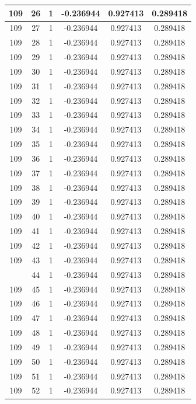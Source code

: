 \documentclass[12pt,a4paper]{article}
\numberwithin{equation}{section}
\numberwithin{figure}{section}
\numberwithin{table}{section}
\begin{document}
\begin{longtable}{|c|c|c|c|c|c|}
109 & 26 & 1 & -0.236944 & 0.927413 & 0.289418 \\ \hline
109 & 27 & 1 & -0.236944 & 0.927413 & 0.289418 \\ \hline
109 & 28 & 1 & -0.236944 & 0.927413 & 0.289418 \\ \hline
109 & 29 & 1 & -0.236944 & 0.927413 & 0.289418 \\ \hline
109 & 30 & 1 & -0.236944 & 0.927413 & 0.289418 \\ \hline
109 & 31 & 1 & -0.236944 & 0.927413 & 0.289418 \\ \hline
109 & 32 & 1 & -0.236944 & 0.927413 & 0.289418 \\ \hline
109 & 33 & 1 & -0.236944 & 0.927413 & 0.289418 \\ \hline
109 & 34 & 1 & -0.236944 & 0.927413 & 0.289418 \\ \hline
109 & 35 & 1 & -0.236944 & 0.927413 & 0.289418 \\ \hline
109 & 36 & 1 & -0.236944 & 0.927413 & 0.289418 \\ \hline
109 & 37 & 1 & -0.236944 & 0.927413 & 0.289418 \\ \hline
109 & 38 & 1 & -0.236944 & 0.927413 & 0.289418 \\ \hline
109 & 39 & 1 & -0.236944 & 0.927413 & 0.289418 \\ \hline
109 & 40 & 1 & -0.236944 & 0.927413 & 0.289418 \\ \hline
109 & 41 & 1 & -0.236944 & 0.927413 & 0.289418 \\ \hline
109 & 42 & 1 & -0.236944 & 0.927413 & 0.289418 \\ \hline
109 & 43 & 1 & -0.236944 & 0.927413 & 0.289418 \\ \hline
\pagebreak
109 & 44 & 1 & -0.236944 & 0.927413 & 0.289418 \\ \hline
109 & 45 & 1 & -0.236944 & 0.927413 & 0.289418 \\ \hline
109 & 46 & 1 & -0.236944 & 0.927413 & 0.289418 \\ \hline
109 & 47 & 1 & -0.236944 & 0.927413 & 0.289418 \\ \hline
109 & 48 & 1 & -0.236944 & 0.927413 & 0.289418 \\ \hline
109 & 49 & 1 & -0.236944 & 0.927413 & 0.289418 \\ \hline
109 & 50 & 1 & -0.236944 & 0.927413 & 0.289418 \\ \hline
109 & 51 & 1 & -0.236944 & 0.927413 & 0.289418 \\ \hline
109 & 52 & 1 & -0.236944 & 0.927413 & 0.289418 \\ \hline

\end{longtable}
\end{document}
